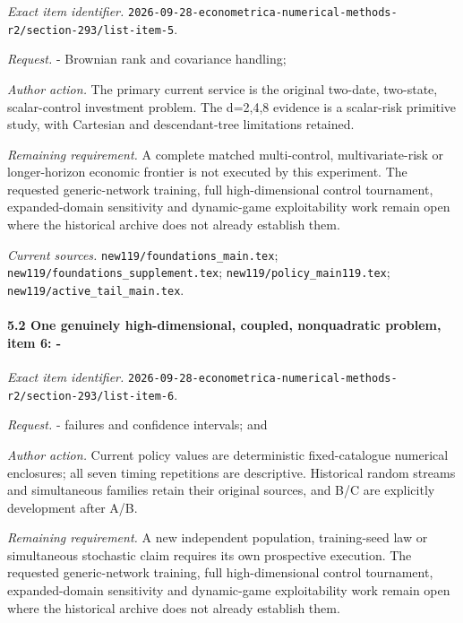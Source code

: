 \emph{Exact item identifier.} \nolinkurl{2026-09-28-econometrica-numerical-methods-r2/section-293/list-item-5}.

\par\emph{Request.} - Brownian rank and covariance handling;

\par\emph{Author action.} The primary current service is the original two-date, two-state, scalar-control investment problem. The d=2,4,8 evidence is a scalar-risk primitive study, with Cartesian and descendant-tree limitations retained.

\par\emph{Remaining requirement.} A complete matched multi-control, multivariate-risk or longer-horizon economic frontier is not executed by this experiment. The requested generic-network training, full high-dimensional control tournament, expanded-domain sensitivity and dynamic-game exploitability work remain open where the historical archive does not already establish them.

\par\emph{Current sources.} \nolinkurl{new119/foundations_main.tex}; \nolinkurl{new119/foundations_supplement.tex}; \nolinkurl{new119/policy_main119.tex}; \nolinkurl{new119/active_tail_main.tex}.

\paragraph{5.2 One genuinely high-dimensional, coupled, nonquadratic problem, item 6: -}

\emph{Exact item identifier.} \nolinkurl{2026-09-28-econometrica-numerical-methods-r2/section-293/list-item-6}.

\par\emph{Request.} - failures and confidence intervals; and

\par\emph{Author action.} Current policy values are deterministic fixed-catalogue numerical enclosures; all seven timing repetitions are descriptive. Historical random streams and simultaneous families retain their original sources, and B/\allowbreak{}C are explicitly development after A/\allowbreak{}B.

\par\emph{Remaining requirement.} A new independent population, training-seed law or simultaneous stochastic claim requires its own prospective execution. The requested generic-network training, full high-dimensional control tournament, expanded-domain sensitivity and dynamic-game exploitability work remain open where the historical archive does not already establish them.


